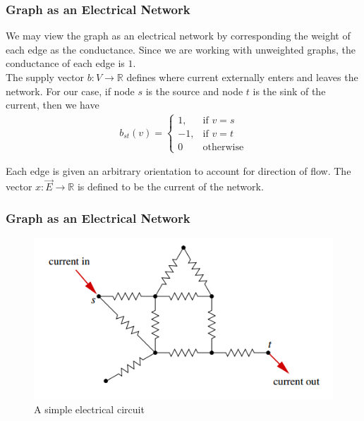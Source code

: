 \documentclass{beamer}
\begin{document}
\begin{frame}
     \frametitle{Graph as an Electrical Network}
     We may view the graph as an electrical network by corresponding  the weight of each edge as the conductance. Since we are working with unweighted graphs, the conductance of each edge is $1$.\\
    \vspace{5mm}
    The supply vector $b: V \rightarrow \mathbb{R}$ defines where current externally enters and leaves the network. For our case, if node $s$ is the source and node $t$ is the sink of the current, then we have
          \begin{align*}
     b_{st}(v) =
\begin{cases}
1, & \text{if }v=s 
\\
-1, & \text{if }v=t
\\
0 & \text{otherwise}
\end{cases}
     \end{align*}

Each edge is given an arbitrary orientation to account for direction of flow.
The vector $x: \vec{E} \rightarrow \mathbb{R}$ is defined to be the current of the network.
\end{frame}


\begin{frame}
     \frametitle{Graph as an Electrical Network}
         \begin{figure}[h]
\begin{center}
\includegraphics[width=0.76\columnwidth]{current_flow}
\end{center}
\caption{A simple electrical circuit}
\label{fig:A simple electrical circuit}
\end{figure}
\end{frame}
\end{document}
